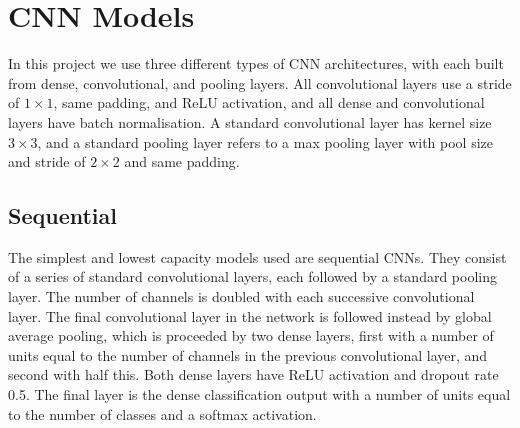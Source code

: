 \documentclass[12pt]{article}
\begin{document}
\section{CNN Models}
In this project we use three different types of CNN architectures, with each built from dense, convolutional, and pooling layers. All convolutional layers use a stride of $1\times1$, same padding, and ReLU activation, and all dense and convolutional layers have batch normalisation. A standard convolutional layer has kernel size $3\times3$, and a standard pooling layer refers to a max pooling layer with pool size and stride of $2\times2$ and same padding.

\subsection{Sequential}
The simplest and lowest capacity models used are sequential CNNs. They consist of a series of standard convolutional layers, each followed by a standard pooling layer. The number of channels is doubled with each successive convolutional layer. The final convolutional layer in the network is followed instead by global average pooling, which is proceeded by two dense layers, first with a number of units equal to the number of channels in the previous convolutional layer, and second with half this. Both dense layers have ReLU activation and dropout rate 0.5. The final layer is the dense classification output with a number of units equal to the number of classes and a softmax activation.
\end{document}

